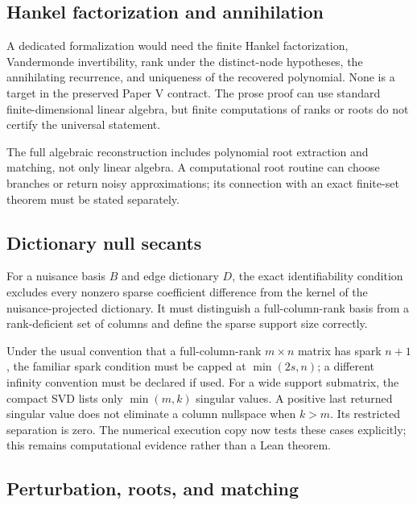 \documentclass[11pt]{article}
\begin{document}
\hypertarget{hankel-factorization-and-annihilation}{%
\subsection{Hankel factorization and annihilation}\label{hankel-factorization-and-annihilation}}

A dedicated formalization would need the finite Hankel factorization, Vandermonde invertibility, rank under the distinct-node hypotheses, the annihilating recurrence, and uniqueness of the recovered polynomial. None is a target in the preserved Paper V contract. The prose proof can use standard finite-dimensional linear algebra, but finite computations of ranks or roots do not certify the universal statement.

The full algebraic reconstruction includes polynomial root extraction and matching, not only linear algebra. A computational root routine can choose branches or return noisy approximations; its connection with an exact finite-set theorem must be stated separately.

\hypertarget{dictionary-null-secants}{%
\subsection{Dictionary null secants}\label{dictionary-null-secants}}

For a nuisance basis \(B\) and edge dictionary \(D\), the exact identifiability condition excludes every nonzero sparse coefficient difference from the kernel of the nuisance-projected dictionary. It must distinguish a full-column-rank basis from a rank-deficient set of columns and define the sparse support size correctly.

Under the usual convention that a full-column-rank \(m\times n\) matrix has spark \(n+1\), the familiar spark condition must be capped at \(\min(2s,n)\); a different infinity convention must be declared if used. For a wide support submatrix, the compact SVD lists only \(\min(m,k)\) singular values. A positive last returned singular value does not eliminate a column nullspace when \(k>m\). Its restricted separation is zero. The numerical execution copy now tests these cases explicitly; this remains computational evidence rather than a Lean theorem.

\hypertarget{perturbation-roots-and-matching}{%
\subsection{Perturbation, roots, and matching}\label{perturbation-roots-and-matching}}
\end{document}
